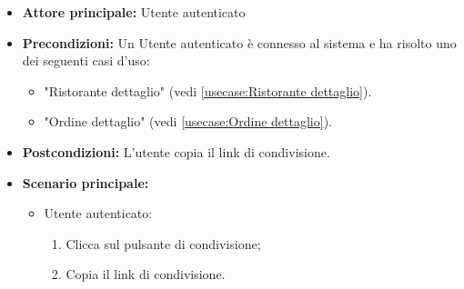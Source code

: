 \label{usecase:Condividi}
\begin{itemize}
	\item \textbf{Attore principale:} Utente autenticato
	\item \textbf{Precondizioni:}
	      Un Utente autenticato è connesso al sistema e ha risolto uno dei seguenti casi
	      d'uso:
	      \begin{itemize}
		      \item "Ristorante dettaglio" (vedi \autoref{usecase:Ristorante dettaglio}).
		      \item "Ordine dettaglio" (vedi \autoref{usecase:Ordine dettaglio}).
	      \end{itemize}
	\item \textbf{Postcondizioni:}
	      L'utente copia il link di condivisione.
	\item \textbf{Scenario principale:}
	      \begin{itemize}
		      \item Utente autenticato:
		            \begin{enumerate}
			            \item Clicca sul pulsante di condivisione;
			            \item Copia il link di condivisione.
		            \end{enumerate}
	      \end{itemize}
\end{itemize}
